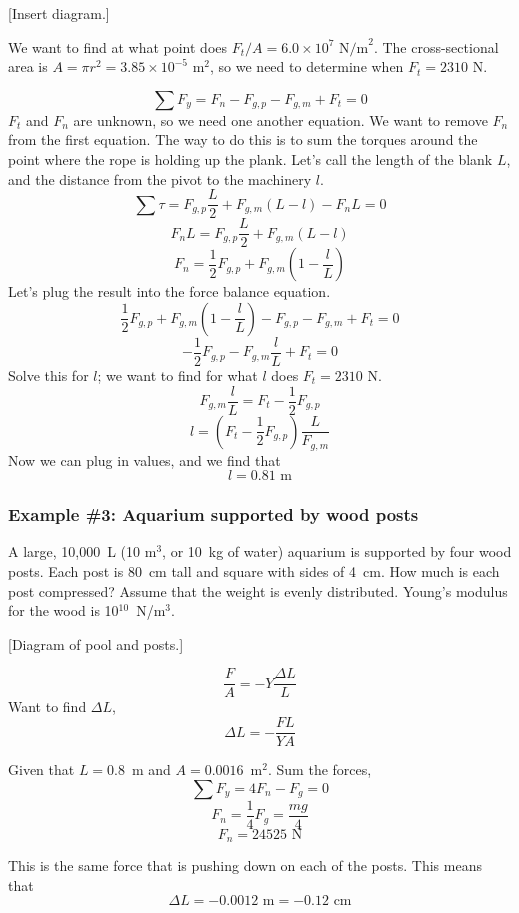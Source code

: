 [Insert diagram.]
\vspace{5cm}

We want to find at what point does $F_t/A=6.0\times 10^7\mbox{ N/m}^2$. The cross-sectional area is $A=\pi r^2=3.85\times 10^{-5}\mbox{ m}^2$, so we need to determine when $F_t=2310\mbox{ N}$.

$$\sum F_y=F_n-F_{g,p}-F_{g,m}+F_t=0$$
$F_t$ and $F_n$ are unknown, so we need one another equation. We want to remove $F_n$ from the first equation. The way to do this is to sum the torques around the point where the rope is holding up the plank. Let's call the length of the blank $L$, and the distance from the pivot to the machinery $l$.
$$\sum \tau=F_{g,p}\frac{L}{2}+F_{g,m}(L-l)-F_nL=0$$
$$F_nL=F_{g,p}\frac{L}{2}+F_{g,m}(L-l)$$
$$F_n=\frac{1}{2}F_{g,p}+F_{g,m}\left(1-\frac{l}{L}\right)$$
Let's plug the result into the force balance equation.
$$\frac{1}{2}F_{g,p}+F_{g,m}\left(1-\frac{l}{L}\right)-F_{g,p}-F_{g,m}+F_t=0$$
$$-\frac{1}{2}F_{g,p}-F_{g,m}\frac{l}{L}+F_t=0$$
Solve this for $l$; we want to find for what $l$ does $F_t=2310\mbox{ N}$.
$$F_{g,m}\frac{l}{L}=F_t-\frac{1}{2}F_{g,p}$$
$$l=\left(F_t-\frac{1}{2}F_{g,p}\right)\frac{L}{F_{g,m}}$$
Now we can plug in values, and we find that
$$\boxed{l=0.81\mbox{ m}}$$

\subsubsection*{Example \#3: Aquarium supported by wood posts}
A large, 10,000~L (10 m$^3$, or 10~kg of water) aquarium is supported by four wood posts. Each post is 80~cm tall and square with sides of 4~cm. How much is each post compressed? Assume that the weight is evenly distributed. Young's modulus for the wood is 10$^{10}$~N/m$^3$.

[Diagram of pool and posts.]
\vspace{4cm}

$$\frac{F}{A} = -Y\frac{\Delta L}{L}$$
Want to find $\Delta L$,
$$\Delta L = -\frac{FL}{YA}$$

Given that $L=0.8$~m and $A=0.0016$~m$^2$. Sum the forces,
$$\sum F_y = 4F_n-F_g = 0$$
$$F_n = \frac{1}{4}F_g = \frac{mg}{4}$$
$$F_n = 24525\mbox{ N}$$

This is the same force that is pushing down on each of the posts. This means that
$$\Delta L = -0.0012\mbox{ m} = -0.12\mbox{ cm}$$


\clearpage
